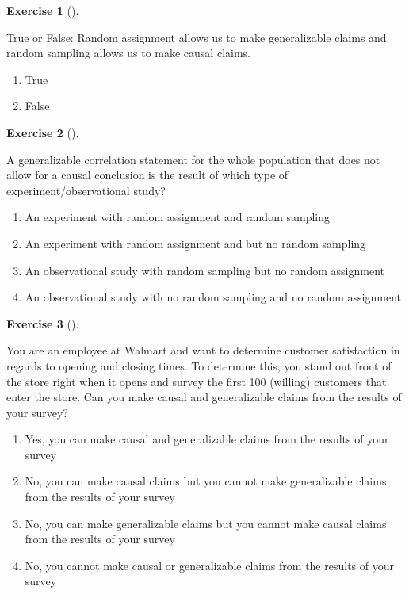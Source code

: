 \documentclass[
  letterpaper,
  DIV=11,
  numbers=noendperiod]{scrreprt}
\providecommand{\tightlist}{%
  \setlength{\itemsep}{0pt}\setlength{\parskip}{0pt}}\usepackage{longtable,booktabs,array}
\theoremstyle{definition}
\newtheorem{exercise}{Exercise}[chapter]
\theoremstyle{remark}
\begin{document}
\begin{exercise}[]\protect\hypertarget{exr-ch08-c08}{}\label{exr-ch08-c08}

True or False: Random assignment allows us to make generalizable claims
and random sampling allows us to make causal claims.

\begin{enumerate}
\def\labelenumi{\alph{enumi})}
\tightlist
\item
  True
\item
  False
\end{enumerate}

\end{exercise}

\begin{exercise}[]\protect\hypertarget{exr-ch08-c09}{}\label{exr-ch08-c09}

A generalizable correlation statement for the whole population that does
not allow for a causal conclusion is the result of which type of
experiment/observational study?

\begin{enumerate}
\def\labelenumi{\alph{enumi})}
\tightlist
\item
  An experiment with random assignment and random sampling
\item
  An experiment with random assignment and but no random sampling
\item
  An observational study with random sampling but no random assignment
\item
  An observational study with no random sampling and no random
  assignment
\end{enumerate}

\end{exercise}

\begin{exercise}[]\protect\hypertarget{exr-ch08-c10}{}\label{exr-ch08-c10}

You are an employee at Walmart and want to determine customer
satisfaction in regards to opening and closing times. To determine this,
you stand out front of the store right when it opens and survey the
first 100 (willing) customers that enter the store. Can you make causal
and generalizable claims from the results of your survey?

\begin{enumerate}
\def\labelenumi{\alph{enumi})}
\tightlist
\item
  Yes, you can make causal and generalizable claims from the results of
  your survey
\item
  No, you can make causal claims but you cannot make generalizable
  claims from the results of your survey
\item
  No, you can make generalizable claims but you cannot make causal
  claims from the results of your survey
\item
  No, you cannot make causal or generalizable claims from the results of
  your survey
\end{enumerate}

\end{exercise}
\end{document}
